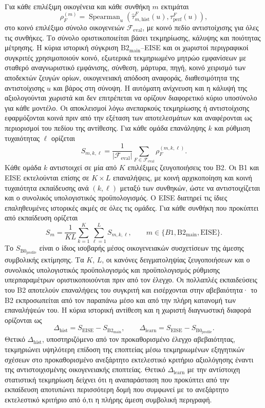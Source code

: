 \documentclass[11pt,a4paper]{article}
\begin{document}
Για κάθε επιλέξιμη οικογένεια και κάθε συνθήκη $m$ εκτιμάται
\[
\rho_F^{(m)}=\operatorname{Spearman}_{u}\!\left(
\widehat\tau_{m,\mathrm{hist}}^F(u),
\tau_{\mathrm{perf}}^F(u)
\right),
\]
στο κοινό επιλέξιμο σύνολο οικογενειών $\mathcal F_{\mathrm{eval}}$, με κοινό πεδίο αντιστοίχισης για όλες τις συνθήκες. Το σύνολο οριστικοποιείται βάσει τεκμηρίωσης, κάλυψης και ποιότητας μέτρησης. Η κύρια ιστορική σύγκριση $\mathrm{B2}_{\mathrm{main}}$--EISE και οι χωριστοί περιγραφικοί συγκριτές χρησιμοποιούν κοινό, εξωτερικά τεκμηριωμένο μητρώο εμφανίσεων με σταθερό αναγνωριστικό εμφάνισης, σύνθεση, μάρτυρα, πηγή, κοινό χειρισμό των αποδεκτών ζευγών ορίων, οικογενειακή απόδοση αναφοράς, διαθεσιμότητα της αντιστοίχισης $u$ και βάρος στη σύνοψη. Η αυτόματη ανίχνευση και η κάλυψή της αξιολογούνται χωριστά και δεν επιτρέπεται να ορίζουν διαφορετικό κύριο υποσύνολο για κάθε μοντέλο. Οι αποκλεισμοί λόγω ανεπαρκούς τεκμηρίωσης ή αντιστοίχισης εφαρμόζονται κοινά πριν από την εξέταση των αποτελεσμάτων και αναφέρονται ως περιορισμοί του πεδίου της αντίθεσης. Για κάθε ομάδα επανάληψης $k$ και ρύθμιση τυχαιότητας $\ell$ ορίζεται
\[
S_{m,k,\ell}=\frac{1}{|\mathcal F_{\mathrm{eval}}|}
\sum_{F\in\mathcal F_{\mathrm{eval}}}\rho_F^{(m,k,\ell)}.
\]
Κάθε ομάδα $k$ αντιστοιχεί σε μία από $K$ επιλέξιμες ζευγοποιήσεις του B2. Οι B1 και EISE εκτελούνται επίσης σε $K\times L$ επαναλήψεις, με κοινή αρχικοποίηση και κοινή τυχαιότητα εκπαίδευσης ανά $(k,\ell)$ μεταξύ των συνθηκών, ώστε να αντιστοιχίζεται και ο συνολικός υπολογιστικός προϋπολογισμός. Ο EISE διατηρεί τις ίδιες επαληθευμένες ιστορικές ακμές σε όλες τις ομάδες. Για κάθε συνθήκη που προκύπτει από εκπαίδευση ορίζεται
\[
S_m=\frac{1}{KL}\sum_{k=1}^{K}\sum_{\ell=1}^{L}S_{m,k,\ell},
\qquad m\in\{B1,\mathrm{B2}_{\mathrm{main}},\mathrm{EISE}\}.
\]
Το $S_{\mathrm{B0}_{\mathrm{profile}}}$ είναι ο ίδιος ισοβαρής μέσος οικογενειακών συσχετίσεων της άμεσης συμβολικής εκτίμησης. Τα $K$, $L$, οι κανόνες δειγματοληψίας ζευγοποιήσεων και ο συνολικός υπολογιστικός προϋπολογισμός και προϋπολογισμός ρύθμισης υπερπαραμέτρων οριστικοποιούνται πριν από τον έλεγχο. Οι πολλαπλές εκπαιδεύσεις του B2 αποτελούν επαναλήψεις του συγκριτή και εισέρχονται στην αβεβαιότητα· το B2 εκπροσωπείται από τον παραπάνω μέσο και από την πλήρη κατανομή των επαναλήψεών του. Η κύρια ιστορική αντίθεση και η χωριστή διαγνωστική διαφορά ορίζονται ως
\[
\Delta_{\mathrm{hist}}=S_{\mathrm{EISE}}-S_{\mathrm{B2}_{\mathrm{main}}},
\qquad
\Delta_{\mathrm{learn}}=S_{\mathrm{EISE}}-S_{\mathrm{B0}_{\mathrm{profile}}}.
\]
Θετικό $\Delta_{\mathrm{hist}}$, υποστηριζόμενο από τον προκαθορισμένο έλεγχο αβεβαιότητας, τεκμηριώνει υψηλότερη επίδοση της εποπτείας μέσω τεκμηριωμένων εξηγητικών σχέσεων στο προκαθορισμένο ανεξάρτητο εκτελεστικό κριτήριο αξιολόγησης έναντι της αντιστοιχισμένης οικογενειακής εποπτείας. Θετικό $\Delta_{\mathrm{learn}}$ με την αντίστοιχη στατιστική τεκμηρίωση δείχνει ότι η αναπαράσταση που προκύπτει από την εκπαίδευση αποτυπώνει περισσότερη δομή που συμφωνεί με το ανεξάρτητο εκτελεστικό κριτήριο από ό,τι η πλήρης άμεση συμβολική περιγραφή.
\end{document}
